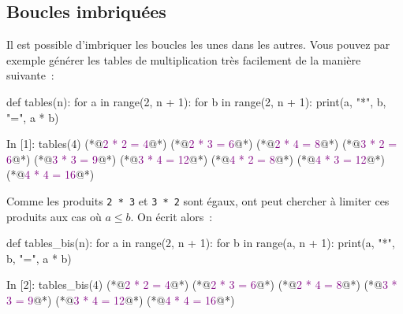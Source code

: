 \documentclass{magnoliaold}
\begin{document}



\subsection{Boucles imbriquées}

Il est possible d'imbriquer les boucles les unes dans les autres. Vous pouvez par exemple générer les tables de multiplication très facilement de la manière suivante~:

\begin{pythoncodeline}
def tables(n):
    for a in range(2, n + 1):
        for b in range(2, n + 1):
            print(a, "*", b, "=", a * b)
\end{pythoncodeline}
\begin{pythoncode}
In [1]: tables(4)
(*@\textcolor{purple}{2 * 2 = 4}@*)
(*@\textcolor{purple}{2 * 3 = 6}@*)
(*@\textcolor{purple}{2 * 4 = 8}@*)
(*@\textcolor{purple}{3 * 2 = 6}@*)
(*@\textcolor{purple}{3 * 3 = 9}@*)
(*@\textcolor{purple}{3 * 4 = 12}@*)
(*@\textcolor{purple}{4 * 2 = 8}@*)
(*@\textcolor{purple}{4 * 3 = 12}@*)
(*@\textcolor{purple}{4 * 4 = 16}@*)
\end{pythoncode}
Comme les produits \verb!2 * 3! et \verb!3 * 2! sont égaux, ont peut chercher à limiter
ces produits aux cas où $a \leq b$. On écrit alors~:
\begin{pythoncodeline}
def tables_bis(n):
    for a in range(2, n + 1):
        for b in range(a, n + 1):
            print(a, "*", b, "=", a * b)
\end{pythoncodeline}
\begin{pythoncode}
In [2]: tables_bis(4)
(*@\textcolor{purple}{2 * 2 = 4}@*)
(*@\textcolor{purple}{2 * 3 = 6}@*)
(*@\textcolor{purple}{2 * 4 = 8}@*)
(*@\textcolor{purple}{3 * 3 = 9}@*)
(*@\textcolor{purple}{3 * 4 = 12}@*)
(*@\textcolor{purple}{4 * 4 = 16}@*)
\end{pythoncode}
\end{document}
